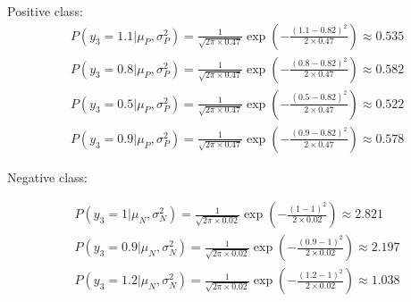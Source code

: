 \documentclass[12pt]{article}
\begin{document}
\begin{enumerate}[leftmargin=\labelsep]
    \vspace{10pt}
    Positive class:
    \begin{equation*}
        \begin{aligned}
            &P(y_3 = 1.1|\mu_P, \sigma_P^2) = \frac{1}{\sqrt{2\pi \times 0.47}} \exp\left(-\frac{(1.1 - 0.82)^2}{2 \times 0.47}\right) \approx 0.535\\
            &P(y_3 = 0.8|\mu_P, \sigma_P^2) = \frac{1}{\sqrt{2\pi \times 0.47}} \exp\left(-\frac{(0.8 - 0.82)^2}{2 \times 0.47}\right) \approx 0.582\\
            &P(y_3 = 0.5|\mu_P, \sigma_P^2) = \frac{1}{\sqrt{2\pi \times 0.47}} \exp\left(-\frac{(0.5 - 0.82)^2}{2 \times 0.47}\right) \approx 0.522\\
            &P(y_3 = 0.9|\mu_P, \sigma_P^2) = \frac{1}{\sqrt{2\pi \times 0.47}} \exp\left(-\frac{(0.9 - 0.82)^2}{2 \times 0.47}\right) \approx 0.578
        \end{aligned}
    \end{equation*}


    \vspace{10pt}
    Negative class:
    
    \begin{equation*}
        \begin{aligned}
            &P(y_3 = 1|\mu_N, \sigma_N^2) = \frac{1}{\sqrt{2\pi \times 0.02}} \exp\left(-\frac{(1 - 1)^2}{2 \times 0.02}\right) \approx 2.821 \\
            &P(y_3 = 0.9|\mu_N, \sigma_N^2) = \frac{1}{\sqrt{2\pi \times 0.02}} \exp\left(-\frac{(0.9 - 1)^2}{2 \times 0.02}\right) \approx 2.197 \\
            &P(y_3 = 1.2|\mu_N, \sigma_N^2) = \frac{1}{\sqrt{2\pi \times 0.02}} \exp\left(-\frac{(1.2 - 1)^2}{2 \times 0.02}\right) \approx 1.038\\
        \end{aligned}
    \end{equation*}


\end{enumerate}
\end{document}
